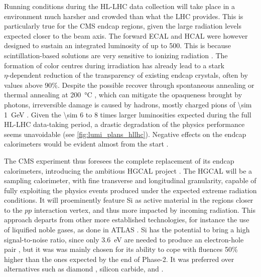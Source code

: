 \documentclass[11pt]{article}
\begin{document}
Running conditions during the \ac{HL-LHC} data collection will take place in a environment much harsher and crowded than what the \ac{LHC} provides.
This is particularly true for the \ac{CMS} endcap regions, given the large radiation levels expected closer to the beam axis.
The forward \ac{ECAL} and \ac{HCAL} were however designed to sustain an integrated luminosity of up to \SI{500}{\invfb}.
This is because scintillation-based solutions are very sensitive to ionizing radiation \cite{wigmans_new_developments}.
The formation of color centres during irradiation has already lead to a stark \(\eta\text{-dependent}\) reduction of the transparency of existing endcap  crystals, often by values above 90\%.
Despite the possible recover through spontaneous annealing or thermal annealing at \SI{200}{\celsius} \cite{annealing_calorimeter}, which can mitigate the opaqueness brought by photons, irreversible damage is caused by hadrons, mostly charged pions of \SI{\sim 1}{\GeV} \cite{wigmans,wigmans2}.
Given the \num{\sim 6} to \num{8} times larger luminosities expected during the full \ac{HL-LHC} data-taking period, a drastic degradation of the physics performance seems unavoidable (see \cref{fig:lumi_plans_hllhc}).
Negative effects on the endcap calorimeters would be evident almost from the start \cite{hgcal_technical_proposal}.

The CMS experiment thus foresees the complete replacement of its endcap calorimeters, introducing the ambitious \ac{HGCAL} project \cite{hgcalTDR}.
The \ac{HGCAL} will be a sampling calorimeter, with fine transverse and longitudinal granularity, capable of fully exploiting the physics events produced under the expected extreme radiation conditions.
It will proeminently feature \ac{Si} as active material in the regions closer to the \(pp\) interaction vertex, and thus more impacted by incoming radiation.
This approach departs from other more established technologies, for instance the use of liquified noble gases, as done in \ac{ATLAS} \cite{fabiola_calorimetry}.
\ac{Si} has the potential to bring a high signal-to-noise ratio, since only \SI{3.6}{\eV} are needed to produce an electron-hole pair \cite{fabiola_calorimetry}, but it was was mainly chosen for its ability to cope with fluences 50\% higher than the ones expected by the end of Phase-2.
It was preferred over alternatives such as diamond \cite{diamond_sensors}, silicon carbide,  and .
\end{document}

